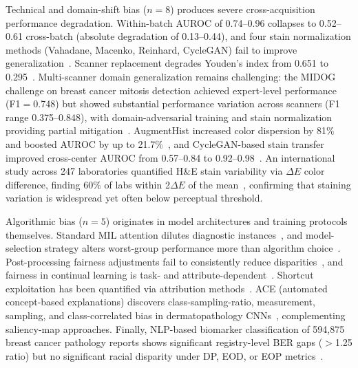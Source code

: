 Technical and domain-shift bias ($n\!=\!8$) produces severe cross-acquisition performance degradation. Within-batch AUROC of 0.74--0.96 collapses to 0.52--0.61 cross-batch (absolute degradation of 0.13--0.44), and four stain normalization methods (Vahadane, Macenko, Reinhard, CycleGAN) fail to improve generalization~\citep{lin2025stain, komen2024batch}. Scanner replacement degrades Youden's index from 0.651 to 0.295~\citep{roschewitz2023automatic}. Multi-scanner domain generalization remains challenging: the MIDOG challenge on breast cancer mitosis detection achieved expert-level performance (F1$=$0.748) but showed substantial performance variation across scanners (F1 range 0.375--0.848), with domain-adversarial training and stain normalization providing partial mitigation~\citep{aubreville2022mitosis}. AugmentHist increased color dispersion by 81\% and boosted AUROC by up to 21.7\%~\citep{franchet2024bias}, and CycleGAN-based stain transfer improved cross-center AUROC from 0.57--0.84 to 0.92--0.98~\citep{nerrienet2023standardized}. An international study across 247 laboratories quantified H\&E stain variability via $\Delta E$ color difference, finding 60\% of labs within 2$\Delta E$ of the mean~\citep{dunn2025stain}, confirming that staining variation is widespread yet often below perceptual threshold.

Algorithmic bias ($n\!=\!5$) originates in model architectures and training protocols themselves. Standard MIL attention dilutes diagnostic instances~\citep{ling2024agent}, and model-selection strategy alters worst-group performance more than algorithm choice~\citep{zong2023medfair}. Post-processing fairness adjustments fail to consistently reduce disparities~\citep{soltan2024challenges}, and fairness in continual learning is task- and attribute-dependent~\citep{cecconi2024fairness}. Shortcut exploitation has been quantified via attribution methods~\citep{ly2024shortcut, skarga2023bias}. ACE (automated concept-based explanations) discovers class-sampling-ratio, measurement, sampling, and class-correlated bias in dermatopathology CNNs~\citep{sauter2022validating}, complementing saliency-map approaches. Finally, NLP-based biomarker classification of 594,875 breast cancer pathology reports shows significant registry-level BER gaps ($>$1.25 ratio) but no significant racial disparity under DP, EOD, or EOP metrics~\citep{tschida2025evaluating}.

